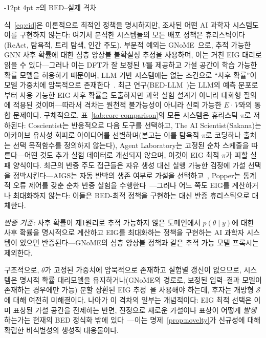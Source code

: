\documentclass[11pt]{article}
\makeatletter
\renewcommand\subsection{\@startsection{subsection}{2}{\z@}%
  {-12pt \@plus -2pt \@minus -2pt}%
  {4pt \@plus 1pt}%
  {\normalfont\normalsize\bfseries}}
\makeatother
\begin{document}
\subsection{$\pi$의 BED--실제 격차}

식~\ref{eq:eid}은 이론적으로 최적인 정책을 명시하지만, 조사된 어떤 AI 과학자 시스템도 이를 구현하지 않는다: 여기서 분석한 시스템들의 모든 배포 정책은 휴리스틱이다(ReAct, 탐욕적, 트리 탐색, 인간 주도). 부분적 예외는 GNoME~\citep{merchant2023gnome}으로, 추적 가능한 GNN 사후 확률에 대한 심층 앙상블 불확실성 추정을 사용하며, 이는 거친 EIG 대리로 읽을 수 있다---그러나 이는 DFT가 잘 보정된 $V$를 제공하고 가설 공간이 학습 가능한 확률 모델을 허용하기 때문이며, LLM 기반 시스템에는 없는 조건으로 ``사후 확률''이 모델 가중치에 암묵적으로 존재한다~\citep{foster2021dad}. 최근 연구(BED-LLM~\citep{choudhury2026bedllm})는 LLM의 예측 분포로부터 사용 가능한 EIG 사후 확률을 도출하지만 과학 실험 설계가 아니라 대화형 질의에 적용된 것이며---따라서 격차는 원천적 불가능성이 아니라 신뢰 가능한 $E$·$V$와의 통합 문제이다. 구체적으로, 표~\ref{tab:core-comparison}의 모든 시스템은 휴리스틱 $\pi$로 저하된다: Coscientist는 반응적으로 다음 도구를 선택하고, The AI Scientist(Sakana)는 아카이브 유사성 회피로 아이디어를 선별하며(본고는 이를 탐욕적 $\pi$로 코딩하나 출처는 선택 목적함수를 정의하지 않는다), Agent Laboratory는 고정된 순차 스케줄을 따른다---어떤 것도 추가 실험 데이터로 개선되지 않으며, 이것이 EIG 최적 $\pi$가 피할 실패 양식이다. 최근의 반증 주도 접근들은 자유 생성 대신 실행 가능한 검정에 가설 선택을 정박시킨다---AIGS는 자동 반박의 생존 여부로 가설을 선택하고~\citep{liu2024aigs}, Popper는 통계적 오류 제어를 갖춘 순차 반증 실험을 수행한다~\citep{huang2025popper}---그러나 어느 쪽도 EIG를 계산하거나 최대화하지 않는다: 이들은 BED-최적 정책을 구현하는 대신 반증 휴리스틱으로 대체한다.

\textit{반증 기준:} 사후 확률이 제1원리로 추적 가능하지 않은 도메인에서 $p(\theta \mid y)$에 대한 사후 확률을 명시적으로 계산하고 EIG를 최대화하는 정책을 구현하는 AI 과학자 시스템이 있으면 반증된다---GNoME의 심층 앙상블 정책과 같은 추적 가능 모델 프록시는 제외한다.

구조적으로, $\theta$가 고정된 가중치에 암묵적으로 존재하고 실험별 갱신이 없으므로, 시스템은 명시적 확률 대리모델을 유지하거나(GNoME의 경로로, 보정된 입력--결과 모델이 존재하는 경우에만 가능) 분할 상환된 EIG 추정~\citep{foster2021dad}을 사용해야 하는데, 후자는 개방형 $\mathcal{S}$에 대해 여전히 미해결이다. 나아가 이 격차의 일부는 개념적이다: EIG 최적 선택은 이미 표상된 가설 공간을 전제하는 반면, 진정으로 새로운 가설이나 표상이 어떻게 \emph{발생}하는가는 현재의 BED 정식화 밖에 있다~\citep{yanai2019night}---이는 명제~\ref{prop:novelty}가 신규성에 대해 확립한 비식별성의 생성적 대응물이다.
\end{document}
